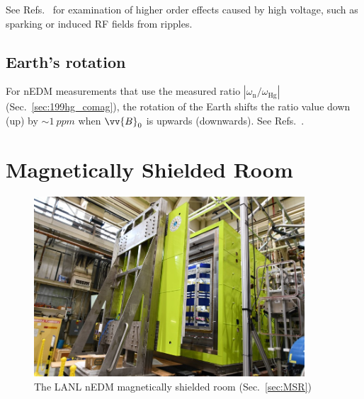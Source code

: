 See Refs.~\cite{baker_apparatus_2014, pendlebury_revised_2015} for examination of higher order effects caused by high voltage, such as sparking or induced RF fields from ripples.

\subsection*{Earth's rotation}

For nEDM measurements that use the measured ratio $|\omega_\text{n}/\omega_\text{Hg}|$ (Sec.~\ref{sec:199hg_comag}), the rotation of the Earth shifts the ratio value down (up) by $\sim\qty{1}{ppm}$ when $\vv{B}_0$ is upwards (downwards). See Refs.~\cite{lamoreaux_earth_rotation_comment, baker_reply_to_lamoreaux, pendlebury_revised_2015}.


\section
{
    \texorpdfstring{Magnetically Shielded Room}
                    {Magnetically Shielded Room}\label{sec:MSR}
}


\begin{figure}
    \centering
    \includegraphics[width=0.9\textwidth]{figures/completed_msr.jpg}
    \caption
    {The LANL nEDM magnetically shielded room (Sec.~\ref{sec:MSR})}
    \label{fig:MSR}
\end{figure}

